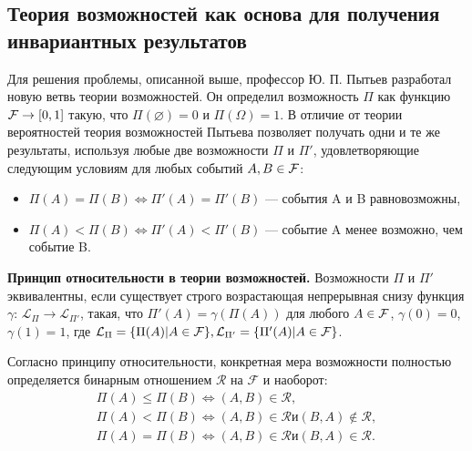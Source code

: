 \documentclass[a4paper, 14pt]{extarticle}
\begin{document}
\subsection{Теория возможностей как основа для получения инвариантных результатов}
Для решения проблемы, описанной выше, профессор Ю. П. Пытьев разработал новую ветвь теории возможностей. Он определил возможность $\Pi$ как функцию ${\cal F} \rightarrow [0, 1]$ такую, что $\Pi(\varnothing) = 0$ и $\Pi(\Omega) = 1$. В отличие от теории вероятностей теория возможностей Пытьева позволяет получать одни и те же результаты, используя любые две возможности $\Pi$ и $\Pi'$, удовлетворяющие следующим условиям для любых событий $A, B \in {\cal F}$:
\begin{itemize}
    \item $\Pi(A) = \Pi(B) \Leftrightarrow \Pi'(A) = \Pi'(B)$ --- события A и B равновозможны,
    \item $\Pi(A) < \Pi(B) \Leftrightarrow \Pi'(A) < \Pi'(B)$ --- событие A менее возможно, чем событие B.
\end{itemize}

\textbf{Принцип относительности в теории возможностей.} Возможности $\Pi$ и $\Pi'$ эквивалентны, если существует строго возрастающая непрерывная снизу функция $\gamma$: $\mathcal{L}_{\Pi} \rightarrow \mathcal{L}_{\Pi'}$, такая, что $\Pi'(A) = \gamma(\Pi(A))$ для любого $A \in {\cal F}$, $\gamma(0) = 0$, $\gamma(1) = 1$, 
где $\mathcal{L}_{\Pi} = \{ \Pi(A) | A \in {\cal F} \}, \mathcal{L}_{\Pi'} = \{ \Pi'(A) | A \in {\cal F} \}$.

Согласно принципу относительности, конкретная мера возможности полностью определяется бинарным отношением $\mathcal{R}$ на $\mathcal{F}$ и наоборот:
\begin{equation}
    \begin{gathered}
        \Pi(A) \leq \Pi(B) \Leftrightarrow (A, B) \in \mathcal{R},\\
        \Pi(A) < \Pi(B) \Leftrightarrow (A, B) \in \mathcal{R} и (B, A) \notin \mathcal{R},\\
        \Pi(A) = \Pi(B) \Leftrightarrow (A, B) \in \mathcal{R} и (B, A) \in \mathcal{R}.
    \end{gathered}
\end{equation}
\end{document}
